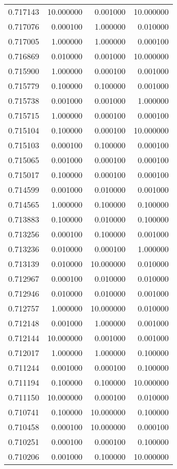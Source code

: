\begin{tabular}{rrrr}
0.717143 & 10.000000 & 0.001000 & 10.000000 \\
0.717076 & 0.000100 & 1.000000 & 0.010000 \\
0.717005 & 1.000000 & 1.000000 & 0.000100 \\
0.716869 & 0.010000 & 0.001000 & 10.000000 \\
0.715900 & 1.000000 & 0.000100 & 0.001000 \\
0.715779 & 0.100000 & 0.100000 & 0.001000 \\
0.715738 & 0.001000 & 0.001000 & 1.000000 \\
0.715715 & 1.000000 & 0.000100 & 0.000100 \\
0.715104 & 0.100000 & 0.000100 & 10.000000 \\
0.715103 & 0.000100 & 0.100000 & 0.000100 \\
0.715065 & 0.001000 & 0.000100 & 0.000100 \\
0.715017 & 0.100000 & 0.000100 & 0.000100 \\
0.714599 & 0.001000 & 0.010000 & 0.001000 \\
0.714565 & 1.000000 & 0.100000 & 0.100000 \\
0.713883 & 0.100000 & 0.010000 & 0.100000 \\
0.713256 & 0.000100 & 0.100000 & 0.001000 \\
0.713236 & 0.010000 & 0.000100 & 1.000000 \\
0.713139 & 0.010000 & 10.000000 & 0.010000 \\
0.712967 & 0.000100 & 0.010000 & 0.010000 \\
0.712946 & 0.010000 & 0.010000 & 0.001000 \\
0.712757 & 1.000000 & 10.000000 & 0.010000 \\
0.712148 & 0.001000 & 1.000000 & 0.001000 \\
0.712144 & 10.000000 & 0.001000 & 0.001000 \\
0.712017 & 1.000000 & 1.000000 & 0.100000 \\
0.711244 & 0.001000 & 0.000100 & 0.100000 \\
0.711194 & 0.100000 & 0.100000 & 10.000000 \\
0.711150 & 10.000000 & 0.000100 & 0.010000 \\
0.710741 & 0.100000 & 10.000000 & 0.100000 \\
0.710458 & 0.000100 & 10.000000 & 0.000100 \\
0.710251 & 0.000100 & 0.000100 & 0.100000 \\
0.710206 & 0.001000 & 0.100000 & 10.000000 \\

\end{tabular}
